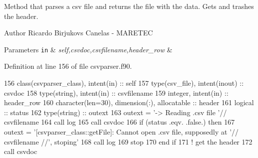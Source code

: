 Method that parses a csv file and returns the file with the data. Gets and trashes the header. 

\begin{DoxyAuthor}{Author}
Ricardo Birjukovs Canelas -\/ M\+A\+R\+E\+T\+EC 
\end{DoxyAuthor}

\begin{DoxyParams}[1]{Parameters}
\mbox{\tt in}  & {\em self,csvdoc,csvfilename,header\+\_\+row} & \\
\hline
\end{DoxyParams}


Definition at line 156 of file csvparser.\+f90.


\begin{DoxyCode}
156     \textcolor{keywordtype}{class}(csvparser\_class), \textcolor{keywordtype}{intent(in)} :: self
157     \textcolor{keywordtype}{type}(csv\_file), \textcolor{keywordtype}{intent(inout)} :: csvdoc
158     \textcolor{keywordtype}{type}(string), \textcolor{keywordtype}{intent(in)} :: csvfilename
159     \textcolor{keywordtype}{integer}, \textcolor{keywordtype}{intent(in)} :: header\_row
160     \textcolor{keywordtype}{character(len=30)}, \textcolor{keywordtype}{dimension(:)}, \textcolor{keywordtype}{allocatable} :: header
161     \textcolor{keywordtype}{logical} :: status
162     \textcolor{keywordtype}{type}(string) :: outext
163     outext = \textcolor{stringliteral}{'-> Reading .csv file '}// csvfilename
164     \textcolor{keyword}{call }log%
165     \textcolor{keyword}{call }csvdoc%
166     \textcolor{keywordflow}{if} (status .eqv. .false.) \textcolor{keywordflow}{then}
167         outext = \textcolor{stringliteral}{'[csvparser\_class::getFile]: Cannot open .csv file, supposedly at '}// csvfilename //\textcolor{stringliteral}{',
       stoping'}
168         \textcolor{keyword}{call }log%
169         stop
170 \textcolor{keywordflow}{    end if}
171     \textcolor{comment}{! get the header}
172     \textcolor{keyword}{call }csvdoc%
\end{DoxyCode}

